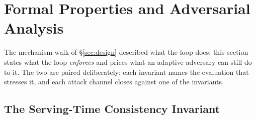 \section{Formal Properties and Adversarial Analysis}
\label{sec:formal}

The mechanism walk of \S\ref{sec:design} described what the loop does;
this section states what the loop \emph{enforces} and prices what an
adaptive adversary can still do to it. The two are paired deliberately:
each invariant names the evaluation that stresses it, and each attack
channel closes against one of the invariants.

\subsection{The Serving-Time Consistency Invariant}
\label{sec:invariant}

